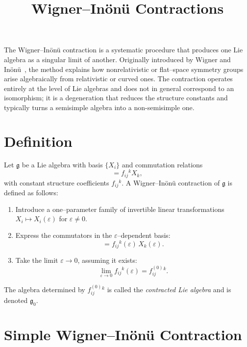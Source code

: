 \documentclass[11pt]{article}
\title{Wigner--In\"on\"u Contractions}
\author{}
\date{}
\begin{document}
\maketitle


The Wigner--In\"on\"u contraction is a systematic procedure that produces one Lie
algebra as a singular limit of another.  Originally introduced by Wigner and
In\"on\"u~\cite{InonuWigner1953}, the method explains how nonrelativistic or
flat--space symmetry groups arise algebraically from relativistic or curved
ones.  The contraction operates entirely at the level of Lie algebras and does
not in general correspond to an isomorphism; it is a degeneration that reduces
the structure constants and typically turns a semisimple algebra into a
non-semisimple one.

\section{Definition}

Let $\mathfrak{g}$ be a Lie algebra with basis $\{X_i\}$ and commutation
relations
\begin{equation}
   [X_i,X_j] = f_{ij}{}^{k} X_k ,
\end{equation}
with constant structure coefficients $f_{ij}{}^{k}$.  A
Wigner--In\"on\"u contraction of $\mathfrak{g}$ is defined as follows:

\begin{enumerate}
\item Introduce a one--parameter family of invertible linear transformations
      $X_i \mapsto X_i(\varepsilon)$ for $\varepsilon \neq 0$.
\item Express the commutators in the $\varepsilon$--dependent basis:
\begin{equation}
    [X_i(\varepsilon),X_j(\varepsilon)]
        = f_{ij}{}^{k}(\varepsilon) \, X_k(\varepsilon).
\end{equation}
\item Take the limit $\varepsilon \to 0$, assuming it exists:
\begin{equation}
    \lim_{\varepsilon\to 0} f_{ij}{}^{k}(\varepsilon)
        = f^{(0)}_{ij}{}^{k}.
\end{equation}
\end{enumerate}

The algebra determined by $f^{(0)}_{ij}{}^{k}$ is called the
\emph{contracted Lie algebra} and is denoted $\mathfrak{g}_0$.

\section{Simple Wigner--In\"on\"u Contraction}
\end{document}
